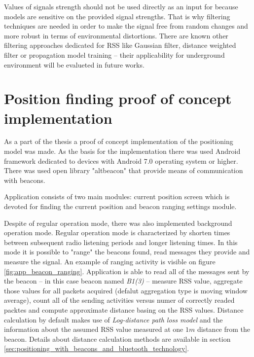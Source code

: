 \documentclass[../main.tex]{subfiles}
\begin{document}
Values of signals strength should not be used directly as an input for because models are sensitive on the provided signal strengths. That is why filtering techniques are needed in order to make the signal free from random changes and more robust in terms of environmental distortions. There are known other filtering approaches dedicated for RSS like Gaussian filter, distance weighted filter or propagation model training \cite{article_rssi_learning_and_filtering_for_navi} -- their applicability for underground environment will be evalueted in future works.


\section{Position finding proof of concept implementation} %
\label{sec:simple_position_finding_algorithm_implementation}

As a part of the thesis a proof of concept implementation of the positioning model was made. As the basis for the implementation there was used Android framework dedicated to devices with Android 7.0 operating system or higher. There was used open library "altbeacon" that provide means of communication with beacons.

Application consists of two main modules: current position screen which is devoted for finding the current position and beacon ranging settings module.

Despite of regular operation mode, there was also implemented background operation mode. Regular operation mode is characterized by shorten times between subsequent radio listening periods and longer listening times. In this mode it is possible to "range" the beacons found, read messages they provide and measure the signal. An example of ranging activity is visible on figure \ref{fig:app_beacon_ranging}. Application is able to read all of the messages sent by the beacon -- in this case beacon named \textit{B1(3)} -- measure RSS value, aggregate those values for all packets acquired (defalut aggregation type is moving window average), count all of the sending activities versus numer of correctly readed packtes and compute approximate distance basing on the RSS values. Distance calculation by default makes use of \textit{Log-distance path loss model} and the information about the assumed RSS value measured at one $1m$ distance from the beacon. Details about distance calculation methods are available in section \ref{sec:positioning_with_beacons_and_bluetooth_technology}.
\end{document}
